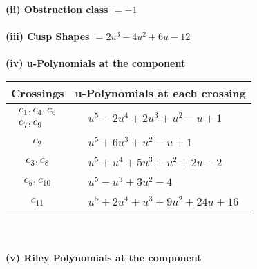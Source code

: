 \documentclass[1p]{elsarticle_modified}
\theoremstyle{definition}
\begin{document}
\flushleft \textbf{(ii) Obstruction class $= -1$}\\~\\
\flushleft \textbf{(iii) Cusp Shapes $= 2 u^3-4 u^2+6 u-12$}\\~\\
\newpage\renewcommand{\arraystretch}{1}
\flushleft \textbf{(iv) u-Polynomials at the component}\newline \\
\begin{tabular}{m{50pt}|m{274pt}}
Crossings & \hspace{64pt}u-Polynomials at each crossing \\
\hline $$\begin{aligned}c_{1},c_{4},c_{6}\\c_{7},c_{9}\end{aligned}$$&$\begin{aligned}
&u^5-2 u^4+2 u^3+u^2- u+1
\end{aligned}$\\
\hline $$\begin{aligned}c_{2}\end{aligned}$$&$\begin{aligned}
&u^5+6 u^3+u^2- u+1
\end{aligned}$\\
\hline $$\begin{aligned}c_{3},c_{8}\end{aligned}$$&$\begin{aligned}
&u^5+u^4+5 u^3+u^2+2 u-2
\end{aligned}$\\
\hline $$\begin{aligned}c_{5},c_{10}\end{aligned}$$&$\begin{aligned}
&u^5- u^3+3 u^2-4
\end{aligned}$\\
\hline $$\begin{aligned}c_{11}\end{aligned}$$&$\begin{aligned}
&u^5+2 u^4+u^3+9 u^2+24 u+16
\end{aligned}$\\
\hline
\end{tabular}\\~\\
\newpage\renewcommand{\arraystretch}{1}
\flushleft \textbf{(v) Riley Polynomials at the component}\newline \\
\end{document}
